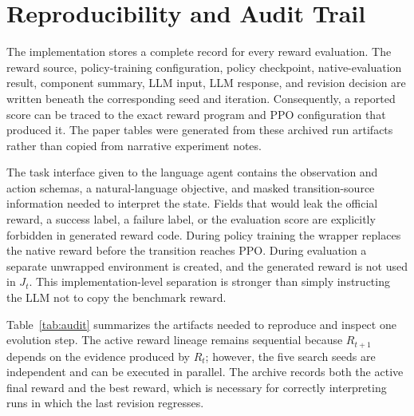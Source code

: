 \section{Reproducibility and Audit Trail}
The implementation stores a complete record for every reward evaluation. The reward source, policy-training configuration, policy checkpoint, native-evaluation result, component summary, LLM input, LLM response, and revision decision are written beneath the corresponding seed and iteration. Consequently, a reported score can be traced to the exact reward program and PPO configuration that produced it. The paper tables were generated from these archived run artifacts rather than copied from narrative experiment notes.

The task interface given to the language agent contains the observation and action schemas, a natural-language objective, and masked transition-source information needed to interpret the state. Fields that would leak the official reward, a success label, a failure label, or the evaluation score are explicitly forbidden in generated reward code. During policy training the wrapper replaces the native reward before the transition reaches PPO. During evaluation a separate unwrapped environment is created, and the generated reward is not used in $J_t$. This implementation-level separation is stronger than simply instructing the LLM not to copy the benchmark reward.

Table~\ref{tab:audit} summarizes the artifacts needed to reproduce and inspect one evolution step. The active reward lineage remains sequential because $R_{t+1}$ depends on the evidence produced by $R_t$; however, the five search seeds are independent and can be executed in parallel. The archive records both the active final reward and the best reward, which is necessary for correctly interpreting runs in which the last revision regresses.

